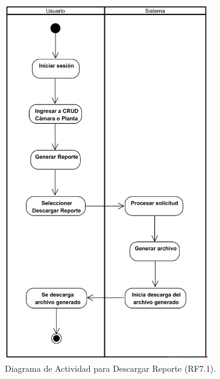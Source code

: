 \begin{figure}[H]
	\centering
		\caption{Diagrama de Actividad para Descargar Reporte (RF7.1).}
\includegraphics[width=0.8\textwidth]{UML/Actividad/Diagrama de Actividad RF7.1 Descargar Reporte.png}
\end{figure}


